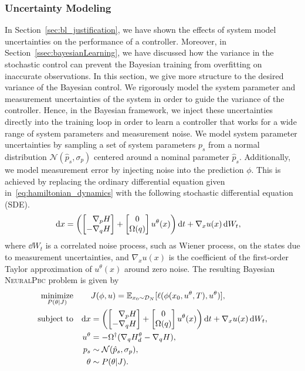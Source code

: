 \subsubsection{Uncertainty Modeling}

In Section~\ref{sec:bl_justification}, we have shown the effects of system model uncertainties on the performance of a controller.
%
Moreover, in Section~\ref{ssec:bayesianLearning}, we have discussed how the variance in the stochastic control can prevent the Bayesian training from overfitting on inaccurate observations.
%
In this section, we give more structure to the desired variance of the Bayesian control.
%
We rigorously model the system parameter and measurement uncertainties of the system in order to guide the variance of the controller.
%
Hence, in the Bayesian framework, we inject these uncertainties directly into
the training loop in order to learn a controller that works for a wide range of
system parameters and measurement noise.
%
We model system parameter uncertainties by sampling a set of system parameters
$p_s$ from a normal distribution $\mathcal{N}(\hat{p}_s, \sigma_p)$
centered around a nominal parameter $\hat{p}_s$.
%
Additionally, we model measurement error by injecting noise into the prediction
$\phi$.
%
This is achieved by replacing the ordinary differential equation given
in~\eqref{eq:hamiltonian_dynamics} with the following stochastic differential
equation (SDE).
\begin{align}
    \operatorname{d}\! x &= \left(\begin{bmatrix}\phantom{-}\nabla_p H \\-\nabla_q H\end{bmatrix} + \begin{bmatrix}0 \\ \Omega(q)\end{bmatrix}u^{\theta}(x) \right) \operatorname{d}\! t + \nabla_x u(x) \operatorname{d}\! W_t, 
    \label{eq:sde_initial}
\end{align}
where $\dd W_t$ is a correlated noise process, such as Wiener process, on the
states due to measurement uncertainties, and $\nabla_x u(x)$ is the coefficient
of the first-order Taylor approximation of $u^{\theta}(x)$ around zero noise. 
The resulting Bayesian \textsc{NeuralPbc} problem is given by
\begin{equation}
    \begin{aligned}
        \underset{P(\theta | J)}{\textrm{minimize}} 
        & & & J(\phi, u) = \mathbb{E}_{x_0 \sim \mathcal{D}_N}[ \ell(\phi(x_0, u^\theta, T), u^\theta)]  , \\
        \textrm{subject to}
        & & \operatorname{d}\! x &= \left(\begin{bmatrix}\phantom{-}\nabla_p H \\-\nabla_q H\end{bmatrix} + \begin{bmatrix}0 \\ \Omega(q)\end{bmatrix}u^{\theta}(x) \right) \operatorname{d}\! t + \nabla_x u(x) \operatorname{d}\! W_t, \\
        & & u^{\theta} &= -\Omega^{\dagger} (\nabla_q H_d^{\theta} - \nabla_q H), \\
        & & p_s &\sim \mathcal{N}(\hat{p}_s, \sigma_p), \\
        & & \theta &\sim P(\theta | J).
    \end{aligned}
    \label{eq:smooth_bayesian_pbc}
\end{equation}

